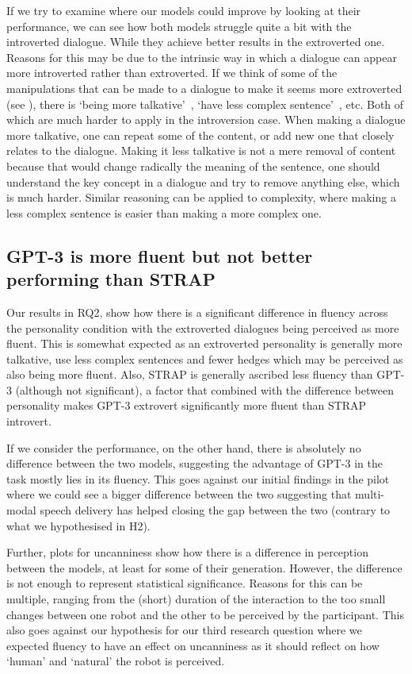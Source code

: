 \documentclass[nomenclature, english, biblatex]{kththesis}
\begin{document}
If we try to examine where our models could improve by looking at their performance, we can see how both models struggle quite a bit with the introverted dialogue. While they achieve better results in the extroverted one. Reasons for this may be due to the intrinsic way in which a dialogue can appear more introverted rather than extroverted. If we think of some of the manipulations that can be made to a dialogue to make it seems more extroverted (see ), there is `being more talkative'~\cite{pennebaker1999linguistic, furnham1990language}, `have less complex sentence'~\cite{furnham1990language}, etc. Both of which are much harder to apply in the introversion case. When making a dialogue more talkative, one can repeat some of the content, or add new one that closely relates to the dialogue. Making it less talkative is not a mere removal of content because that would change radically the meaning of the sentence, one should understand the key concept in a dialogue and try to remove anything else, which is much harder. Similar reasoning can be applied to complexity, where making a less complex sentence is easier than making a more complex one.

\subsection{GPT-3 is more fluent but not better performing than STRAP}
Our results in RQ2, show how there is a significant difference in fluency across the personality condition with the extroverted dialogues being perceived as more fluent. This is somewhat expected as an extroverted personality is generally more talkative, use less complex sentences and fewer hedges which may be perceived as also being more fluent. Also, STRAP is generally ascribed less fluency than GPT-3 (although not significant), a factor that combined with the difference between personality makes GPT-3 extrovert significantly more fluent than STRAP introvert.

If we consider the performance, on the other hand, there is absolutely no difference between the two models, suggesting the advantage of GPT-3 in the task mostly lies in its fluency. This goes against our initial findings in the pilot where we could see a bigger difference between the two suggesting that multi-modal speech delivery has helped closing the gap between the two (contrary to what we hypothesised in H2). 

Further, plots for uncanniness show how there is a difference in perception between the models, at least for some of their generation. However, the difference is not enough to represent statistical significance. Reasons for this can be multiple, ranging from the (short) duration of the interaction to the too small changes between one robot and the other to be perceived by the participant. This also goes against our hypothesis for our third research question where we expected fluency to have an effect on uncanniness as it should reflect on how `human' and `natural' the robot is perceived. 
\end{document}

